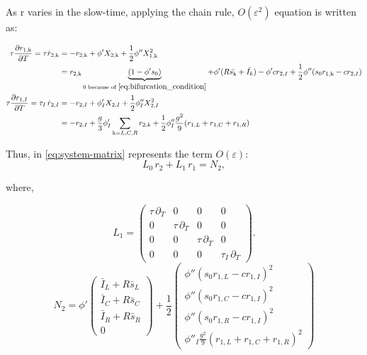 \documentclass[../main.tex]{subfiles}
\begin{document}
As r varies in the slow-time, applying the chain rule, $O(\varepsilon^2)$ equation is written as:

\begin{equation}
\begin{aligned}
\tau\frac{\partial r_{1,\mathrm{k}}}{\partial T} =\tau \dot{r}_{2,\mathrm{k} } & = - r_{2,\mathrm{k}}+ \phi'X_{2,\mathrm{k}}+\frac 12 \phi'' X_{1,\mathrm{k}}^2 \\ &= r_{2,\mathrm{k}}\underbrace{(1-\phi's_0)}_{0 \text{ because of }\ref{eq:bifurcation_condition}} + \phi' (R\bar{s_{\mathrm{k}}}+ \bar{I_k})- \phi'cr_{2,I} + \frac12 \phi''(s_0r_{1,\mathrm{k}}-cr_{2,I})   \\
  \tau\frac{\partial r_{1,I}}{\partial T} =\tau_I\,\dot{r}_{2,I} & = -r_{2,I} + \phi'_I X_{2,I}+ \frac 12 \phi''_IX_{2,I}^2  \\&= -r_{2,I} + \frac g3\phi'_I\sum_{\mathrm{k} = L,C,R}r_{2,k} + \frac 12 \phi''_I \frac{g^2}{9}(r_{1,L}+r_{1,C}+r_{1,R})
  \end{aligned}
  \label{eq:order1}
\end{equation}

Thus, in \eqref{eq:system-matrix} represents the term $O(\varepsilon)$:
\begin{equation}
  L_0\,r_2 + L_1\,r_1 = N_2,
  \label{eq:o2-matrix}
\end{equation}

where,

\begin{equation}
  L_1 = \begin{pmatrix}
    \tau\,\partial_T & 0 & 0 & 0 \\[2mm]
    0 & \tau\,\partial_T & 0 & 0 \\[2mm]
    0 & 0 & \tau\,\partial_T & 0 \\[2mm]
    0 & 0 & 0 & \tau_I\,\partial_T
  \end{pmatrix}.
  \label{eq:L1_matrix}
\end{equation}
\begin{equation}
N_2 = \phi'\begin{pmatrix}
\bar{I}_L + R\bar{s}_L \\\bar{I}_C  + R\bar{s}_C \\ 
\bar{I}_R + R\bar{s}_R \\ 
0
\end{pmatrix} + \frac{1}{2} 
\begin{pmatrix}\phi'' (s_0r_{1,L} - cr_{1,I})^2\\  
\phi''(s_0r_{1,C} - cr_{1,I})^2\\  
\phi''(s_0r_{1,R} - cr_{1,I})^2 \\ 
\phi''_I \frac{g^2}{9}(r_{1,L} +r_{1,C} + r_{1,R})^2 
\end{pmatrix}
\label{eq:N2}
\end{equation}
\end{document}
